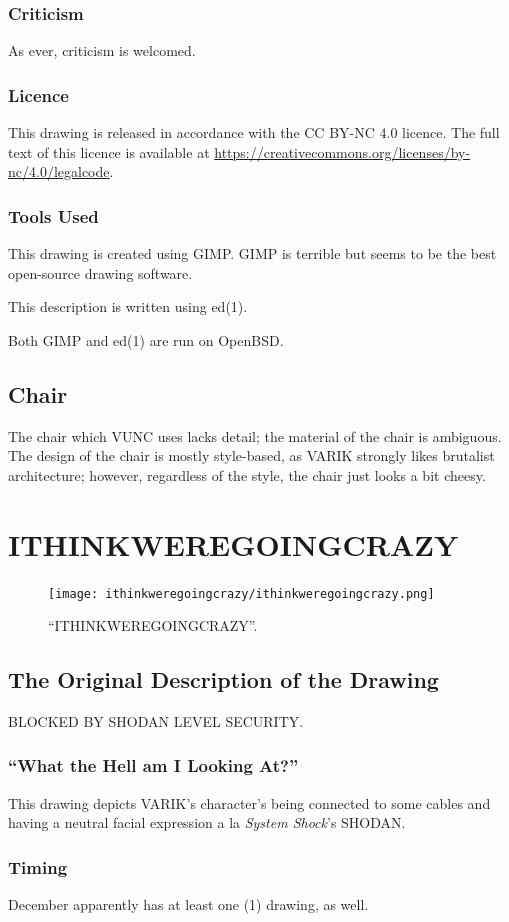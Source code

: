 \documentclass{report}
\begin{document}
\subsection{Criticism}
As ever, criticism is welcomed.
\subsection{Licence}
This drawing is released in accordance with the CC BY-NC 4.0 licence.  The full text of this licence is available at \url{https://creativecommons.org/licenses/by-nc/4.0/legalcode}.
\subsection{Tools Used}
This drawing is created using GIMP\@.  GIMP is terrible but seems to be the best open-source drawing software.

This description is written using ed(1).

Both GIMP and ed(1) are run on OpenBSD\@.
\section{Chair}
The chair which VUNC uses lacks detail; the material of the chair is ambiguous.  The design of the chair is mostly style-based, as VARIK strongly likes brutalist architecture; however, regardless of the style, the chair just looks a bit cheesy.
\chapter{ITHINKWEREGOINGCRAZY}
\begin{figure}[ht]
	\centering
	\texttt{[image: ithinkweregoingcrazy/ithinkweregoingcrazy.png]}
	\caption[center]{``ITHINKWEREGOINGCRAZY''.}
\end{figure}
\section{The Original Description of the Drawing}
BLOCKED BY SHODAN LEVEL SECURITY\@.
\subsection{``What the Hell am I Looking At?''}
This drawing depicts VARIK's character's being connected to some cables and having a neutral facial expression a la \textit{System Shock}'s SHODAN\@.
\subsection{Timing}
December apparently has at least one (1) drawing, as well.
\end{document}
